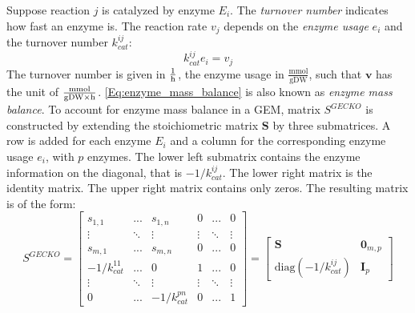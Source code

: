Suppose reaction $j$ is catalyzed by enzyme $E_i$. The \textit{turnover number} indicates how fast an enzyme is. The reaction rate $v_j$ depends on the \textit{enzyme usage} $e_i$ and the turnover number $k_{cat}^{ij}$: 
\begin{equation} \label{Eq:enzyme_mass_balance}
    k_{cat}^{ij} e_i = v_j   
\end{equation}
The turnover number is given in $\frac{1}{\text h}$, the enzyme usage in $\frac{\text{mmol}}{\text{gDW}}$, such that $\mathbf v$ has the unit of $\frac{\text{mmol}}{\text{gDW} \times \text h}$. 
\cref{Eq:enzyme_mass_balance} is also known as \textit{enzyme mass balance}.
To account for enzyme mass balance in a GEM, matrix $S^{GECKO}$ is constructed by extending the stoichiometric matrix $\mathbf S$ by three submatrices. 
A row is added for each enzyme $E_i$ and a column for the corresponding enzyme usage $e_i$, with $p$ enzymes. The lower left submatrix contains the enzyme information on the diagonal, that is $-1/k_{cat}^{ij}$. The lower right matrix is the identity matrix. 
\newpage The upper right matrix contains only zeros.
The resulting matrix is of the form:
\begin{equation*}
    S^{GECKO} = \left[\begin{array}{ccc|ccc} 
        s_{1,1} & \text{...} & s_{1,n} & 0 & \text{...} & 0 \\ 
        \vdots & \ddots & \vdots & \vdots & \ddots & \vdots \\
        s_{m,1} & \text{...} & s_{m,n} & 0 & \text{...} & 0 \\
        \hline 
        -1/k_{cat}^{11} & \text{...} & 0 & 1 & \text{...} & 0 \\ 
        \vdots & \ddots & \vdots & \vdots & \ddots & \vdots \\
        0 & \text{...} & -1/k_{cat}^{pn} & 0 & \text{...} & 1
    \end{array}\right] = 
    \left[\begin{array}{cc} 
        \mathbf S & \mathbf 0_{m,p} \\
        \text{diag} (-1/k_{cat}^{ij}) & \mathbf I_p
    \end{array}\right]
\end{equation*}

